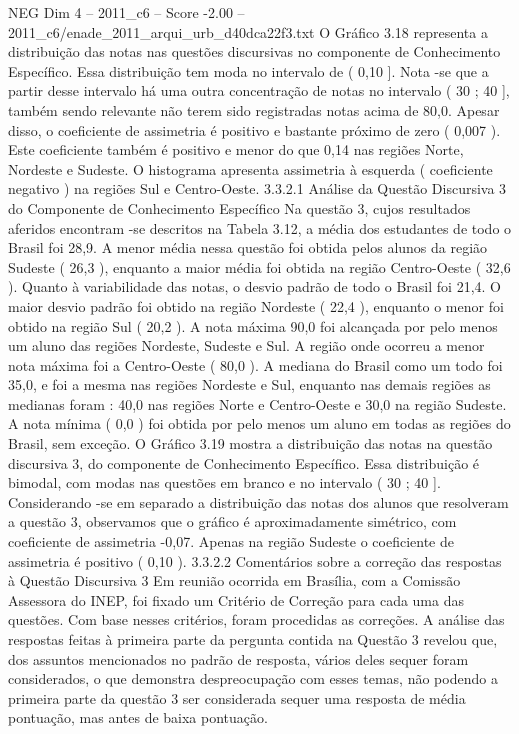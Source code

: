 \begin{textsample}{NEG Dim 4 – 2011\_c6 – Score -2.00 – 2011\_c6/enade\_2011\_arqui\_urb\_d40dca22f3.txt}
O Gráfico 3.18 representa a distribuição das notas nas questões discursivas no componente de Conhecimento Específico.
Essa distribuição tem moda no intervalo de ( 0,10 ].
Nota -se que a partir desse intervalo há uma outra concentração de notas no intervalo ( 30 ; 40 ], também sendo relevante não terem sido registradas notas acima de 80,0.
Apesar disso, o coeficiente de assimetria é positivo e bastante próximo de zero ( 0,007 ).
Este coeficiente também é positivo e menor do que 0,14 nas regiões Norte, Nordeste e Sudeste.
O histograma apresenta assimetria à esquerda ( coeficiente negativo ) na regiões Sul e Centro-Oeste. 3.3.2.1 Análise da Questão Discursiva 3 do Componente de Conhecimento Específico Na questão 3, cujos resultados aferidos encontram -se descritos na Tabela 3.12, a média dos estudantes de todo o Brasil foi 28,9.
A menor média nessa questão foi obtida pelos alunos da região Sudeste ( 26,3 ), enquanto a maior média foi obtida na região Centro-Oeste ( 32,6 ).
Quanto à variabilidade das notas, o desvio padrão de todo o Brasil foi 21,4.
O maior desvio padrão foi obtido na região Nordeste ( 22,4 ), enquanto o menor foi obtido na região Sul ( 20,2 ).
A nota máxima 90,0 foi alcançada por pelo menos um aluno das regiões Nordeste, Sudeste e Sul.
A região onde ocorreu a menor nota máxima foi a Centro-Oeste ( 80,0 ).
A mediana do Brasil como um todo foi 35,0, e foi a mesma nas regiões Nordeste e Sul, enquanto nas demais regiões as medianas foram : 40,0 nas regiões Norte e Centro-Oeste e 30,0 na região Sudeste.
A nota mínima ( 0,0 ) foi obtida por pelo menos um aluno em todas as regiões do Brasil, sem exceção.
O Gráfico 3.19 mostra a distribuição das notas na questão discursiva 3, do componente de Conhecimento Específico.
Essa distribuição é bimodal, com modas nas questões em branco e no intervalo ( 30 ; 40 ].
Considerando -se em separado a distribuição das notas dos alunos que resolveram a questão 3, observamos que o gráfico é aproximadamente simétrico, com coeficiente de assimetria -0,07.
Apenas na região Sudeste o coeficiente de assimetria é positivo ( 0,10 ). 3.3.2.2 Comentários sobre a correção das respostas à Questão Discursiva 3 Em reunião ocorrida em Brasília, com a Comissão Assessora do INEP, foi fixado um Critério de Correção para cada uma das questões.
Com base nesses critérios, foram procedidas as correções.
A análise das respostas feitas à primeira parte da pergunta contida na Questão 3 revelou que, dos assuntos mencionados no padrão de resposta, vários deles sequer foram considerados, o que demonstra despreocupação com esses temas, não podendo a primeira parte da questão 3 ser considerada sequer uma resposta de média pontuação, mas antes de baixa pontuação.

\end{textsample}
